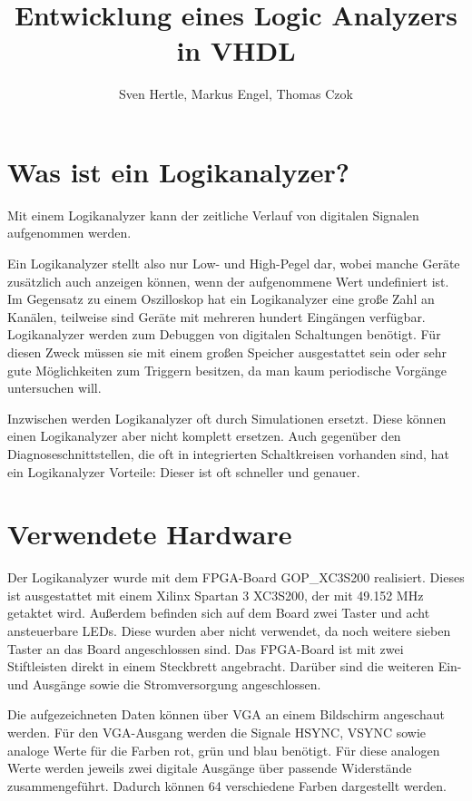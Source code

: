 \documentclass[IN,ngerman,utf8,12pt]{tumbook}
\title{Entwicklung eines Logic Analyzers in VHDL}
\author{Sven Hertle, Markus Engel, Thomas Czok}
\begin{document}
\maketitle%
\tableofcontents%
\clearpage

\chapter{Was ist ein Logikanalyzer?}
Mit einem Logikanalyzer kann der zeitliche Verlauf von digitalen Signalen aufgenommen werden.

Ein Logikanalyzer stellt also nur Low- und High-Pegel dar, wobei manche Geräte zusätzlich auch anzeigen können, wenn der aufgenommene Wert undefiniert ist.
Im Gegensatz zu einem Oszilloskop hat ein Logikanalyzer eine große Zahl an Kanälen, teilweise sind Geräte mit mehreren hundert Eingängen verfügbar.
Logikanalyzer werden zum Debuggen von digitalen Schaltungen benötigt.
Für diesen Zweck müssen sie mit einem großen Speicher ausgestattet sein oder sehr gute Möglichkeiten zum Triggern besitzen, da man kaum periodische Vorgänge untersuchen will.

Inzwischen werden Logikanalyzer oft durch Simulationen ersetzt.
Diese können einen Logikanalyzer aber nicht komplett ersetzen.
Auch gegenüber den Diagnoseschnittstellen, die oft in integrierten Schaltkreisen vorhanden sind, hat ein Logikanalyzer Vorteile: Dieser ist oft schneller und genauer.

\chapter{Verwendete Hardware}
\label{kap:hardware}
Der Logikanalyzer wurde mit dem FPGA-Board GOP\_XC3S200 realisiert.
Dieses ist ausgestattet mit einem Xilinx Spartan 3 XC3S200, der mit 49.152 MHz getaktet wird.
Außerdem befinden sich auf dem Board zwei Taster und acht ansteuerbare LEDs.
Diese wurden aber nicht verwendet, da noch weitere sieben Taster an das Board angeschlossen sind.
Das FPGA-Board ist mit zwei Stiftleisten direkt in einem Steckbrett angebracht.
Darüber sind die weiteren Ein- und Ausgänge sowie die Stromversorgung angeschlossen.

Die aufgezeichneten Daten können über VGA an einem Bildschirm angeschaut werden.
Für den VGA-Ausgang werden die Signale HSYNC, VSYNC sowie analoge Werte für die Farben rot, grün und blau benötigt.
Für diese analogen Werte werden jeweils zwei digitale Ausgänge über passende Widerstände zusammengeführt.
Dadurch können 64 verschiedene Farben dargestellt werden.
\end{document}
